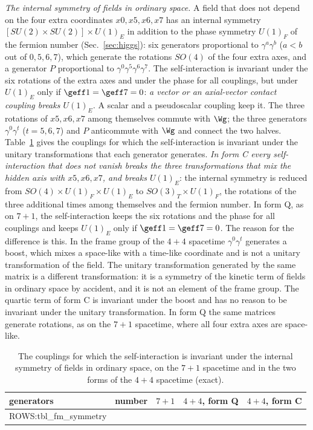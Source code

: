\emph{The internal symmetry of fields in ordinary space.} A field that does not depend on the four
extra coordinates $x0,x5,x6,x7$ has an internal symmetry $[SU(2)\times SU(2)]\times U(1)_E$ in
addition to the phase symmetry $U(1)_F$ of the fermion number (Sec.~\ref{sec:higgs}): six generators
proportional to $\gamma^{a}\gamma^{b}$ ($a<b$ out of $0,5,6,7$), which generate the rotations $SO(4)$
of the four extra axes, and a generator $P$ proportional to $\gamma^{0}\gamma^{5}\gamma^{6}\gamma^{7}$.
The self-interaction is invariant under the six rotations of the extra axes and under the phase for
all couplings, but under $U(1)_E$ only if $\geff1=\geff7=0$: \emph{a vector or an axial-vector contact
coupling breaks $U(1)_E$.} A scalar and a pseudoscalar coupling keep it.
The three rotations of $x5,x6,x7$ among themselves commute with $\Wg$; the three generators
$\gamma^{0}\gamma^{t}$ ($t=5,6,7$) and $P$ anticommute with $\Wg$ and connect the two halves.
Table~\ref{tab:intsym} gives the couplings for which the self-interaction is invariant under the
unitary transformations that each generator generates. \emph{In form C every self-interaction that
does not vanish breaks the three transformations that mix the hidden axis with $x5,x6,x7$, and
breaks $U(1)_E$}: the internal symmetry is reduced from $SO(4)\times U(1)_F\times U(1)_E$ to
$SO(3)_T\times U(1)_F$, the rotations of the three additional times among themselves and the fermion
number. In form Q, as on $7+1$, the self-interaction keeps the six rotations and the phase for all
couplings and keeps $U(1)_E$ only if $\geff1=\geff7=0$. The reason for the difference is this. In the
frame group of the $4+4$ spacetime $\gamma^{0}\gamma^{t}$ generates a boost, which mixes a space-like
with a time-like coordinate and is not a unitary transformation of the field. The unitary
transformation generated by the same matrix is a different transformation: it is a symmetry of the
kinetic term of fields in ordinary space by accident, and it is not an element of the frame group.
The quartic term of form C is invariant under the boost and has no reason to be invariant under the
unitary transformation. In form Q the same matrices generate rotations, as on the $7+1$ spacetime,
where all four extra axes are space-like.

\begin{table}
\caption{\label{tab:intsym}The couplings for which the self-interaction is invariant under the
internal symmetry of fields in ordinary space, on the $7+1$ spacetime and in the two forms of the
$4+4$ spacetime (exact).}
\begin{ruledtabular}
\begin{tabular}{lcccc}
generators & number & $7+1$ & $4+4$, form Q & $4+4$, form C \\
\hline
{{ROWS:tbl_fm_symmetry}}
\end{tabular}
\end{ruledtabular}
\end{table}
